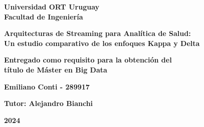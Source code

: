 \begin{titlepage}
    \centering
    \vspace*{1.5cm}
    
    {\large \textbf{Universidad ORT Uruguay\\
    Facultad de Ingeniería}\par}
    
    \vspace{1.5cm}
    
    {\LARGE\bfseries Arquitecturas de Streaming para Analítica de Salud:\\[0.4em]
    Un estudio comparativo de los enfoques Kappa y Delta \par}
    
    \vspace{1.5cm}
    
    {\large \textbf{Entregado como requisito para la obtención del\\
    título de Máster en Big Data} \par}
    
    \vspace{3cm}
    
    {\large \textbf{Emiliano Conti - 289917}\par}
    
    \vspace{1cm}
    
    {\large \textbf{Tutor: Alejandro Bianchi} \par}
    
    \vspace{1cm}
    
    {\Large \textbf{2024}\par}
\end{titlepage}
